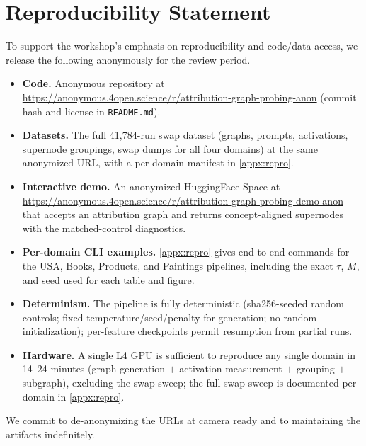 \section{Reproducibility Statement}
\label{sec:repro}

To support the workshop's emphasis on reproducibility and code/data access, we release the following anonymously for the review period.

\begin{itemize}\itemsep0pt
  \item \textbf{Code.} Anonymous repository at \url{https://anonymous.4open.science/r/attribution-graph-probing-anon} (commit hash and license in \texttt{README.md}).
  \item \textbf{Datasets.} The full 41{,}784-run swap dataset (graphs, prompts, activations, supernode groupings, swap dumps for all four domains) at the same anonymized URL, with a per-domain manifest in \cref{appx:repro}.
  \item \textbf{Interactive demo.} An anonymized HuggingFace Space at \url{https://anonymous.4open.science/r/attribution-graph-probing-demo-anon} that accepts an attribution graph and returns concept-aligned supernodes with the matched-control diagnostics.
  \item \textbf{Per-domain CLI examples.} \cref{appx:repro} gives end-to-end commands for the USA, Books, Products, and Paintings pipelines, including the exact $\tau$, $M$, and seed used for each table and figure.
  \item \textbf{Determinism.} The pipeline is fully deterministic (sha256-seeded random controls; fixed temperature/seed/penalty for generation; no random initialization); per-feature checkpoints permit resumption from partial runs.
  \item \textbf{Hardware.} A single L4 GPU is sufficient to reproduce any single domain in 14--24 minutes (graph generation $+$ activation measurement $+$ grouping $+$ subgraph), excluding the swap sweep; the full swap sweep is documented per-domain in \cref{appx:repro}.
\end{itemize}

We commit to de-anonymizing the URLs at camera ready and to maintaining the artifacts indefinitely.
